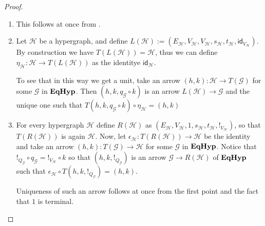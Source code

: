 \documentclass[a4paper,UKenglish,cleveref,pdftex,thm-restate,numberwithinsect]{lipics-v2021}
\newcommand{\catname}[1]{\textbf{\textup{#1}}}
\newcommand{\EqHyp}{\catname{EqHyp}} %
\newcommand{\id}[1]{\mathsf{id}_{#1}}
\begin{document}
\begin{proof}\label{proof:forghyp}
	\begin{enumerate}
		\item  This follows at once from .
		\item  	Let $\mathcal{H}$ be a hypergraph, and define $L(\mathcal{H}) := (E_\mathcal{H}, V_{\mathcal{H}}, V_{\mathcal{H}}, s_\mathcal{H}, t_\mathcal{H}, \id{V_\mathcal{H}})$.  By construction we have $T(L(\mathcal{H}))=\mathcal{H}$, thus we can define
		$\eta_\mathcal{H}\colon \mathcal{H}\to T(L(\mathcal{H}))$ as the identitye $\id{\mathcal{H}}$. 
		
		To see that in this way we get a unit,  take an arrow $(h, k)\colon \mathcal{H}\to T(\mathcal{G})$ for some $\mathcal{G}$ in $\EqHyp$. Then $(h,k, q_{\mathcal{G}}\circ k)$ is an arrow $L(\mathcal{H})\to \mathcal{G}$ and the unique one such that $T(h,k, q_{\mathcal{G}}\circ k)\circ \eta_{\mathcal{H}}=(h,k)$
		
		\item For every hypergraph $\mathcal{H}$ define $R(\mathcal{H})$ as $(E_\mathcal{H}, V_{\mathcal{H}}, 1, s_\mathcal{H}, t_\mathcal{H}, !_{V_\mathcal{H}})$, so that $T(R(\mathcal{H}))$ is again $\mathcal{H}$.  Now, let $\epsilon_{\mathcal{H}}\colon T(R(\mathcal{H}))\to \mathcal{H}$ be the identity and take an arrow $(h,k)\colon T(\mathcal{G})\to \mathcal{H}$ for some $\mathcal{G}$ in $\EqHyp$.  Notice that $!_{Q_\mathcal{G}}\circ q_{\mathcal{G}}=!_{V_{\mathcal{H}}}\circ k$
		so that $(h,k, !_{Q_\mathcal{G}})$ is an arrow $\mathcal{G}\to R(\mathcal{H})$ of $\EqHyp$ such that $\epsilon_{\mathcal{H}}\circ T(h,k, !_{Q_\mathcal{G}})=(h,k)$.
		
		Uniqueness of such an arrow follows at once from the first point and the fact that $1$ is terminal. \qedhere 
	\end{enumerate}
\end{proof}
\end{document}

